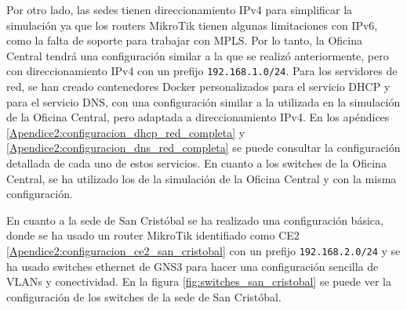 Por otro lado, las sedes tienen direccionamiento IPv4 para simplificar la simulación ya que los routers MikroTik tienen algunas limitaciones con IPv6, como la falta de soporte para trabajar con MPLS. Por lo tanto, la Oficina Central tendrá una configuración similar a la que se realizó anteriormente, pero con direccionamiento IPv4 con un prefijo \texttt{192.168.1.0/24}. Para los servidores de red, se han creado contenedores Docker personalizados para el servicio DHCP y para el servicio DNS, con una configuración similar a la utilizada en la simulación de la Oficina Central, pero adaptada a direccionamiento IPv4. En los apéndices \ref{Apendice2:configuracion_dhcp_red_completa} y \ref{Apendice2:configuracion_dns_red_completa} se puede consultar la configuración detallada de cada uno de estos servicios. En cuanto a los switches de la Oficina Central, se ha utilizado los de la simulación de la Oficina Central y con la misma configuración.

\vspace{0.5cm}
En cuanto a la sede de San Cristóbal se ha realizado una configuración básica, donde se ha usado un router MikroTik identifiado como CE2 \ref{Apendice2:configuracion_ce2_san_cristobal} con un prefijo \texttt{192.168.2.0/24} y se ha usado switches ethernet de GNS3 para hacer una configuración sencilla de VLANs y conectividad. En la figura \ref{fig:switches_san_cristobal} se puede ver la configuración de los switches de la sede de San Cristóbal.

